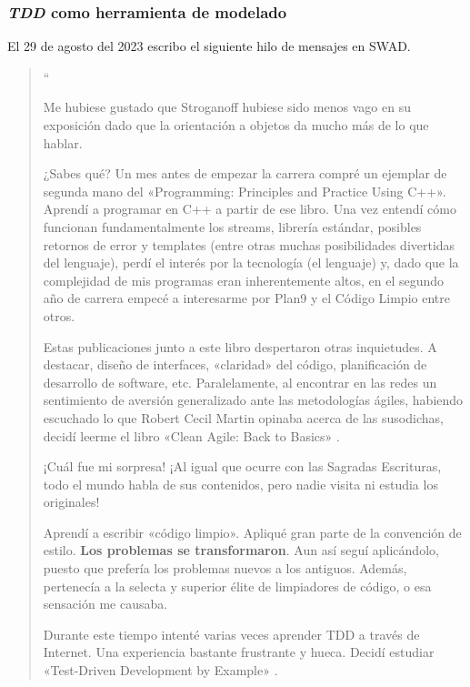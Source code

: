 \subsubsection{\textit{TDD} como herramienta de modelado}

El 29 de agosto del 2023 escribo el siguiente hilo de mensajes en SWAD.

\begin{quote}
``\itshape{%
    Me hubiese gustado que Stroganoff hubiese sido menos vago en su exposición dado
    que la orientación a objetos da mucho más de lo que hablar.

    ¿Sabes qué? Un mes antes de empezar la carrera compré un ejemplar de segunda mano
    del «Programming: Principles and Practice Using C++». \cite{Stroganoff} Aprendí a
    programar en C++ a partir de ese libro. Una vez entendí cómo funcionan fundamentalmente
    los streams, librería estándar, posibles retornos de error y templates (entre otras
    muchas posibilidades divertidas del lenguaje), perdí el interés por la tecnología
    (el lenguaje) y, dado que la complejidad de mis programas eran inherentemente altos,
    en el segundo año de carrera empecé a interesarme por Plan9 \cite{Plan9} y el
    Código Limpio \cite{CleanCode} entre otros.

    Estas publicaciones junto a este libro despertaron otras inquietudes. A destacar,
    diseño de interfaces, «claridad» del código, planificación de desarrollo de software,
    etc. Paralelamente, al encontrar en las redes un sentimiento de aversión generalizado
    ante las metodologías ágiles, habiendo escuchado lo que Robert Cecil Martin opinaba
    acerca de las susodichas, decidí leerme el libro «Clean Agile: Back to Basics» \cite{AgileBackToBasics}.

    ¡Cuál fue mi sorpresa! ¡Al igual que ocurre con las Sagradas Escrituras, todo el mundo 
    habla de sus contenidos, pero nadie visita ni estudia los originales!

    Aprendí a escribir «código limpio». Apliqué gran parte de la convención de estilo.
    \textbf{Los problemas se transformaron}. Aun así seguí aplicándolo, puesto que
    prefería los problemas nuevos a los antiguos. Además, pertenecía a la selecta y
    superior élite de limpiadores de código, o esa sensación me causaba.

    Durante este tiempo intenté varias veces aprender TDD a través de Internet. Una
    experiencia bastante frustrante y hueca. Decidí estudiar «Test-Driven Development
    by Example» \cite{TDD}.

}
\end{quote}
